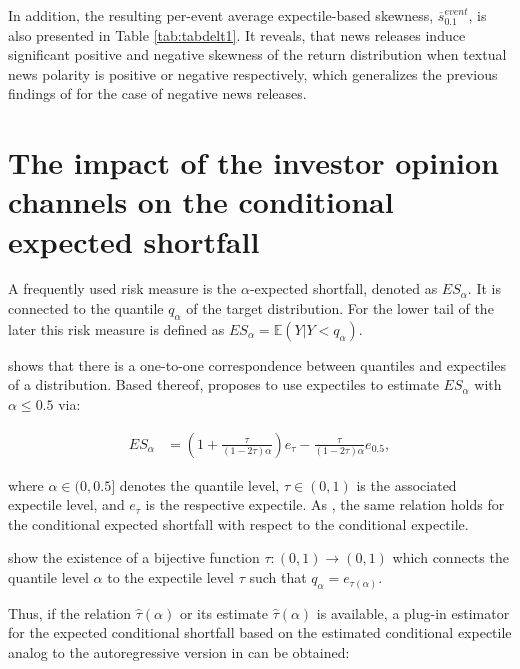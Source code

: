 \documentclass[]{article}
\begin{document}
In addition, the resulting per-event average expectile-based skewness, $\overline s_{0.1}^{event}$, is also presented in Table  \ref{tab:tabdelt1}. It reveals, that news releases induce significant positive and negative skewness of the return distribution when textual news polarity is positive or negative respectively, which generalizes the previous findings of \cite{ekholm2007} for the case of negative news releases.


\hypertarget{impact-of-investor-opinion-on-the-conditional-expected-shortfall-of-the-returns}{%
\section{The impact of the investor opinion channels on the conditional expected shortfall}\label{impact-of-investor-opinion-on-the-conditional-expected-shortfall-of-the-returns}}

A frequently used risk measure is the \(\alpha\)-expected shortfall, denoted as \(ES_{\alpha}\). It is connected to the quantile \(q_\alpha\) of the target distribution. For the lower tail of the later this risk measure is defined as \(ES_\alpha = \mathbb E(Y|Y<q_\alpha)\).

\cite{JONES1994} shows that there is a one-to-one correspondence between quantiles and expectiles of a distribution. Based thereof, \cite{Taylor2008} proposes to use expectiles to estimate $ES_{\alpha}$ with $\alpha\leq 0.5$ via:


\begin{align}
ES_{\alpha} &= \left(1+\frac{\tau}{(1-2\tau)\alpha}\right)e_{\tau} - \frac{\tau}{(1-2\tau)\alpha}e_{0.5},
\end{align}

where \(\alpha\in(0,0.5]\) denotes the quantile level, \(\tau\in(0,1)\) is the associated expectile level, and \(e_{\tau}\) is the respective expectile. As \cite{Taylor2008}, the same relation holds for the conditional expected shortfall with respect to the conditional expectile.

\cite{yao1996} show the existence of a bijective function \(\tau:(0,1)\rightarrow (0,1)\) which connects the quantile level \(\alpha\) to the expectile level \(\tau\) such that \(q_\alpha = e_{\tau(\alpha)}\).

Thus, if the relation \(\hat\tau(\alpha)\) or its estimate \(\hat \tau(\alpha)\) is available, a plug-in estimator for the expected conditional shortfall based on the estimated conditional expectile analog to the autoregressive version in \cite{Taylor2008} can be obtained:
\end{document}
